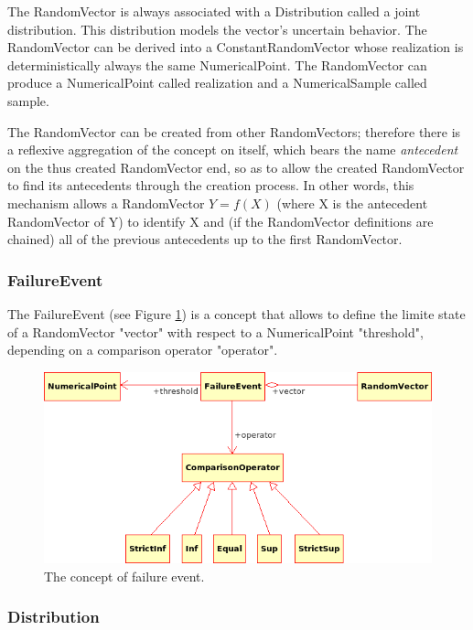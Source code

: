 The RandomVector is always associated with a Distribution called a joint distribution. This distribution models the vector's uncertain behavior. The RandomVector can be derived into a ConstantRandomVector whose realization is deterministically always the same NumericalPoint. The RandomVector can produce a NumericalPoint called realization and a NumericalSample called sample.

The RandomVector can be created from other RandomVectors; therefore there is a reflexive aggregation of the concept on itself, which bears the name \emph{antecedent} on the thus created RandomVector end, so as to allow the created RandomVector to find its antecedents through the creation process. In other words, this mechanism allows a RandomVector $Y = f(X)$ (where X is the antecedent RandomVector of Y) to identify X and (if the RandomVector definitions are chained) all of the previous antecedents up to the first RandomVector.

\subsubsection{FailureEvent}

The FailureEvent (see Figure \ref{fig:failure_event}) is a concept that allows to define the limite state of a RandomVector "vector" with respect to a NumericalPoint "threshold", depending on a comparison operator "operator".

\begin{figure}[htb]
  \begin{center}
    \includegraphics[scale=0.6]{Figures/analysis/failure_event.png}
    \caption{The concept of failure event.}\label{fig:failure_event}
  \end{center}
\end{figure}

\subsubsection{Distribution}

